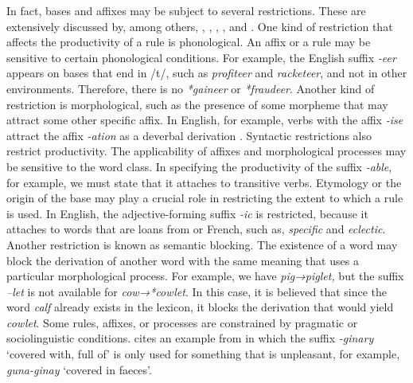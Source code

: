 \documentclass[output=paper]{langsci/langscibook}
\begin{document}
In fact, bases and affixes may be subject to several restrictions. These are extensively discussed by, among others, \citet{Bauer2001}, \citet{HaspelmathSims2010}, \citet{Lieber2009}, \citet{Rainer2005}, and \citet{Plag2006}. One kind of restriction that affects the productivity of a rule is phonological. An affix or a rule may be sensitive to certain phonological conditions. For example, the English suffix \textit{-eer} appears on bases that end in /t/, such as \textit{profiteer} and \textit{racketeer}, and not in other environments. Therefore, there is no \textit{*gaineer} or \textit{*fraudeer}. Another kind of restriction is morphological, such as the presence of some morpheme that may attract some other specific affix. In English, for example, verbs with the affix \textit{-ise} attract the affix \textit{-ation} as a deverbal derivation \citep{Fernandez-Dominguez2013}. Syntactic restrictions also restrict productivity. The applicability of affixes and morphological processes may be sensitive to the word class. In specifying the productivity of the suffix \textit{-able}, for example, we must state that it attaches to transitive verbs. Etymology or the origin of the base may play a crucial role in restricting the extent to which a rule is used. In English, the adjective-forming suffix \textit{-ic} is restricted, because it attaches to words that are loans from  or French, such as, \textit{specific} and \textit{eclectic}. Another restriction is known as semantic blocking. The existence of a word may block the derivation of another word with the same meaning that uses a particular morphological process. For example, we have \textit{pig→piglet,} but the suffix \textit{–let} is not available for \textit{cow→*cowlet}. In this case, it is believed that since the word \textit{calf} already exists in the lexicon, it blocks the derivation that would yield \textit{cowlet}. Some rules, affixes, or processes are constrained by pragmatic or sociolinguistic conditions. \citet[135]{Bauer2001} cites an example from  in which the suffix \textit{-ginary} ‘covered with, full of’ is only used for something that is unpleasant, for example, \textit{guna-ginay} ‘covered in faeces’. 
 
\end{document}
